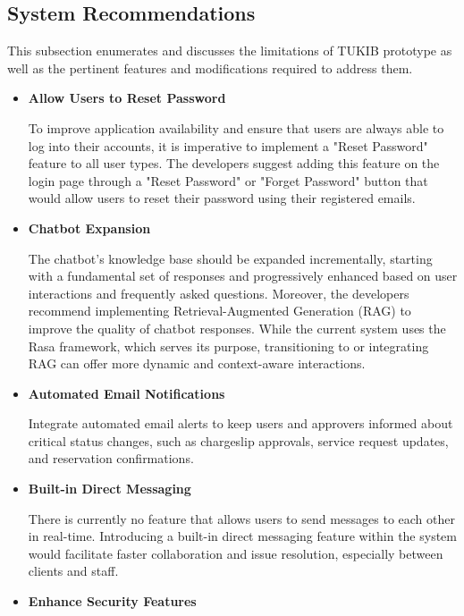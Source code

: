 \subsection{System Recommendations}

This subsection enumerates and discusses the limitations of TUKIB
prototype as well as the pertinent features and modifications required to address
them.

\begin{itemize}

\item \textbf{Allow Users to Reset Password}

To improve application availability and ensure that users are always able to log into their accounts, it is imperative to implement a "Reset Password" feature to all user types. The developers suggest adding this feature on the login page through a "Reset Password" or "Forget Password" button that would allow users to reset their password using their registered emails.

\item \textbf{Chatbot Expansion}

The chatbot's knowledge base should be expanded incrementally, starting with a fundamental set of responses and progressively enhanced based on user interactions and frequently asked questions. Moreover, the developers recommend implementing Retrieval-Augmented Generation (RAG) to improve the quality of chatbot responses. While the current system uses the Rasa framework, which serves its purpose, transitioning to or integrating RAG can offer more dynamic and context-aware interactions.

\item \textbf{Automated Email Notifications}

Integrate automated email alerts to keep users and approvers informed about critical status changes, such as chargeslip approvals, service request updates, and reservation confirmations.

\item \textbf{Built-in Direct Messaging}

There is currently no feature that allows users to send messages to each other in real-time. Introducing a built-in direct messaging feature within the system would facilitate faster collaboration and issue resolution, especially between clients and staff.

\item \textbf{Enhance Security Features}


\end{itemize}
